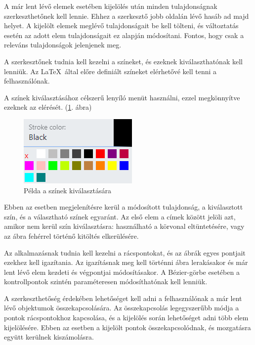 
A már lent lévő elemek esetében kijelölés után minden tulajdonságnak szerkeszthetőnek kell lennie. Ehhez a szerkesztő jobb oldalán lévő hasáb ad majd helyet. A kijelölt elemek meglévő tulajdonságait be kell tölteni, és változtatás esetén az adott elem tulajdonságait ez alapján módosítani. Fontos, hogy csak a releváns tulajdonságok jelenjenek meg.


A szerkesztőnek tudnia kell kezelni a színeket, és ezeknek kiválaszthatónak kell lenniük. Az \LaTeX\ által előre definiált színeket elérhetővé kell tenni a felhasználónak. 

A színek kiválasztásához célszerű lenyíló menüt használni, ezzel megkönnyítve ezeknek az elérését. (\ref{fig:cp}. ábra)

\begin{figure}[!h]
	\centering
	\includegraphics[]{images/colorpicker.png}
	\caption{Példa a színek kiválasztására}
	\label{fig:cp}
\end{figure}

Ebben az esetben megjelenítésre kerül a módosított tulajdonság, a kiválasztott szín, és a választható színek egyaránt. Az első elem a címek között jelöli azt, amikor nem kerül szín kiválasztásra: használható a körvonal eltüntetésére, vagy az ábra fehérrel történő kitöltés elkerülésére.


Az alkalmazásnak tudnia kell kezelni a rácspontokat, és az ábrák egyes pontjait ezekhez kell igazítania. Az igazításnak meg kell történni ábra lerakásakor és már lent lévő elem kezdeti és végpontjai módosításakor. A Bézier-görbe esetében a kontrollpontok szintén paraméteresen módosíthatónak kell lenniük.


A szerkeszthetőség érdekében lehetőséget kell adni a felhasználónak a már lent lévő objektumok összekapcsolására. Az összekapcsolás legegyszerűbb módja a pontok rácspontokhoz kapcsolása, és a kijelölés során lehetőséget adni több elem kijelölésére. Ebben az esetben a kijelölt pontok összekapcsolódnak, és mozgatásra együtt kerülnek kiszámolásra.

